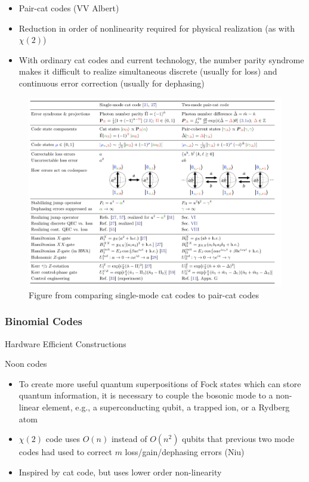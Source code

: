 \documentclass[12]{amsart}
\newcommand\0{\mathbf{0}}
\newcommand\<{\langle}
\renewcommand\>{\rangle}
\begin{document}
\begin{itemize}
		\item Pair-cat codes (VV Albert)
		\item Reduction in order of nonlinearity required for physical realization (as with $\chi(2)$)
		\item With ordinary cat codes and current technology, the number parity syndrome makes it difficult to realize simultaneous discrete (usually for loss) and continuous error correction  (usually for dephasing)
	\end{itemize}

\begin{figure}[H]
\centering
\includegraphics[width=\linewidth,keepaspectratio]{pair_cat.png}	
\caption{Figure from \cite{albert2018multimode} comparing single-mode cat codes to pair-cat codes}
\end{figure}


\subsubsection{Binomial Codes}

Hardware Efficient Constructions

Noon codes

\begin{itemize}
	\item To create more useful quantum superpositions of Fock states which can store quantum information, it is necessary to couple the bosonic mode to a non-linear element, e.g., a superconducting qubit, a trapped ion, or a Rydberg atom
		\item $\chi(2)$ code uses $O(n)$ instead of $O(n^2)$ qubits that previous two mode codes had used to correct $m$ loss/gain/dephasing errors (Niu)
		\item Inspired by cat code, but uses lower order non-linearity
	\end{itemize}
\end{document}
